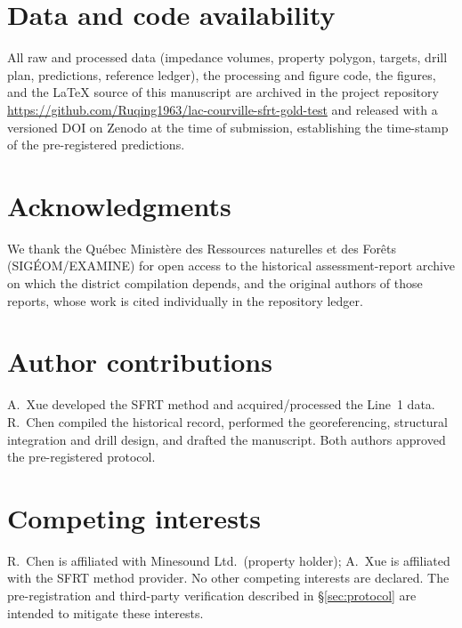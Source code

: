 \documentclass[11pt]{article}
\begin{document}
\section*{Data and code availability}\label{sec:data}
All raw and processed data (impedance volumes, property polygon, targets, drill plan,
predictions, reference ledger), the processing and figure code, the figures, and the
\LaTeX{} source of this manuscript are archived in the project repository
\url{https://github.com/Ruqing1963/lac-courville-sfrt-gold-test} and released with a versioned
DOI on Zenodo at the time of submission, establishing the time-stamp of the pre-registered
predictions.

\section*{Acknowledgments}
We thank the Qu\'ebec Ministère des Ressources naturelles et des For\^ets (SIG\'EOM/EXAMINE) for
open access to the historical assessment-report archive on which the district compilation
depends, and the original authors of those reports, whose work is cited individually in the
repository ledger.

\section*{Author contributions}
A.~Xue developed the SFRT method and acquired/processed the Line~1 data. R.~Chen compiled the
historical record, performed the georeferencing, structural integration and drill design, and
drafted the manuscript. Both authors approved the pre-registered protocol.

\section*{Competing interests}
R.~Chen is affiliated with Minesound Ltd.\ (property holder); A.~Xue is affiliated with the SFRT
method provider. No other competing interests are declared. The pre-registration and
third-party verification described in \S\ref{sec:protocol} are intended to mitigate these
interests.



\end{document}
